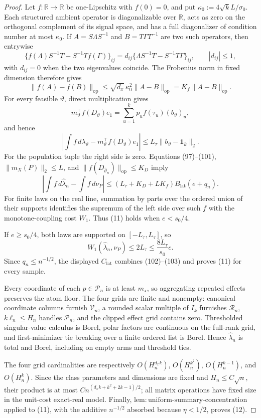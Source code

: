 \documentclass{article}
\begin{document}
\begin{proof}
Let \(f:\mathbb R\to\mathbb R\) be one-Lipschitz with \(f(0)=0\), and put \(\kappa_0:=4\sqrt{k}L/\sigma_0\).  Each structured ambient operator is diagonalizable over \(\mathbb R\), acts as zero on the orthogonal complement of its signal space, and has a full diagonalizer of condition number at most \(\kappa_0\).  If \(A=S\Lambda S^{-1}\) and \(B=T\Gamma T^{-1}\) are two such operators, then entrywise
\[
\{f(\Lambda)S^{-1}T-S^{-1}Tf(\Gamma)\}_{ij}
=d_{ij}\{\Lambda S^{-1}T-S^{-1}T\Gamma\}_{ij},
\qquad |d_{ij}|\le1,                                               \tag{98}
\]
with \(d_{ij}=0\) when the two eigenvalues coincide.  The Frobenius norm in fixed dimension therefore gives
\[
\lVert f(A)-f(B)\rVert_{\mathrm{op}}
\le\sqrt{d_x}\,\kappa_0^2\lVert A-B\rVert_{\mathrm{op}}
=K_f\lVert A-B\rVert_{\mathrm{op}}.                                \tag{99}
\]
For every feasible \(\vartheta\), direct multiplication gives
\[
m_\vartheta^\top f(D_\vartheta)e_1
=\sum_{u=1}^kp_uf(\tau_u)(b_\vartheta)_u,                            \tag{100}
\]
and hence
\[
\left|\int f\,d\lambda_\vartheta-m_\vartheta^\top f(D_\vartheta)e_1\right|
\le L_{\tau}\lVert b_\vartheta-\mathbf1_k\rVert_2.                \tag{101}
\]
For the population tuple the right side is zero.  Equations (97)--(101), \(\lVert m_X(P)\rVert_2\le L\), and \(\lVert f(D_{\widehat\vartheta_n})\rVert_{\mathrm{op}}\le K_D\) imply
\[
\left|\int f\,d\widehat\lambda_n-\int f\,d\nu_P\right|
\le(L_{\tau}+K_D+LK_f)B_{\mathrm{lat}}(e+q_n).                       \tag{102}
\]
For finite laws on the real line, summation by parts over the ordered union of their supports identifies the supremum of the left side over such \(f\) with the monotone-coupling cost \(W_1\).  Thus (11) holds when \(e<s_0/4\).

If \(e\ge s_0/4\), both laws are supported on \([-L_{\tau},L_{\tau}]\), so
\[
W_1(\widehat\lambda_n,\nu_P)\le2L_{\tau}
\le\frac{8L_{\tau}}{s_0}e.                                         \tag{103}
\]
Since \(q_n\le n^{-1/2}\), the displayed \(C_{\mathrm{lat}}\) combines (102)--(103) and proves (11) for every sample.

Every coordinate of each \(p\in\mathcal P_n\) is at least \(m_\star\), so aggregating repeated effects preserves the atom floor.  The four grids are finite and nonempty: canonical coordinate columns furnish \(\mathcal V_n\), a rounded scalar multiple of \(I_k\) furnishes \(\mathcal R_n\), \(k\ell_n\le H_n\) handles \(\mathcal P_n\), and the clipped effect grid contains zero.  Thresholded singular-value calculus is Borel, polar factors are continuous on the full-rank grid, and first-minimizer tie breaking over a finite ordered list is Borel.  Hence \(\widehat\lambda_n\) is total and Borel, including on empty arms and threshold ties.

The four grid cardinalities are respectively \(O(H_n^{d_xk})\), \(O(H_n^{k^2})\), \(O(H_n^{k-1})\), and \(O(H_n^k)\).  Since the class parameters and dimensions are fixed and \(H_n\le C\sqrt n\), their product is at most \(C n^{(d_xk+k^2+2k-1)/2}\); all matrix operations have fixed size in the unit-cost exact-real model.  Finally, \(\mathrm{lem:uniform\text{-}summary\text{-}concentration}\) applied to (11), with the additive \(n^{-1/2}\) absorbed because \(\eta<1/2\), proves (12).
\end{proof}
\end{document}
